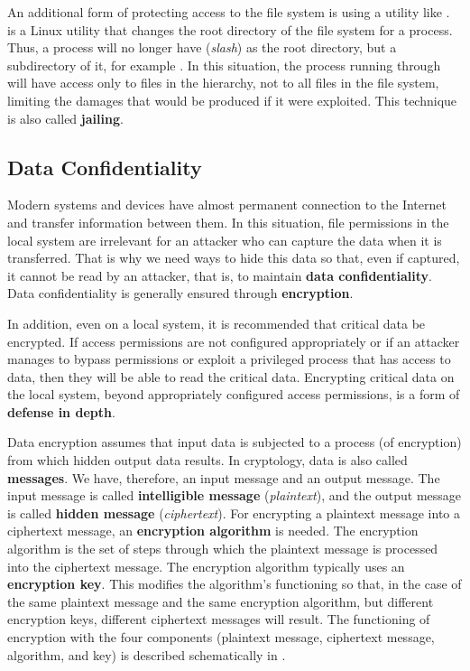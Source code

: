 An additional form of protecting access to the file system is using a utility like .
 is a Linux utility that changes the root directory of the file system for a process.
Thus, a process will no longer have \file{/} (\textit{slash}) as the root directory, but a subdirectory of it, for example .
In this situation, the process running through  will have access only to files in the  hierarchy, not to all files in the file system, limiting the damages that would be produced if it were exploited.
This technique is also called \textbf{jailing}.

\subsection{Data Confidentiality}
\label{sec:sec:data:confidentiality}

Modern systems and devices have almost permanent connection to the Internet and transfer information between them.
In this situation, file permissions in the local system are irrelevant for an attacker who can capture the data when it is transferred.
That is why we need ways to hide this data so that, even if captured, it cannot be read by an attacker, that is, to maintain \textbf{data confidentiality}.
Data confidentiality is generally ensured through \textbf{encryption}.

In addition, even on a local system, it is recommended that critical data be encrypted.
If access permissions are not configured appropriately or if an attacker manages to bypass permissions or exploit a privileged process that has access to data, then they will be able to read the critical data.
Encrypting critical data on the local system, beyond appropriately configured access permissions, is a form of \textbf{defense in depth}.

Data encryption assumes that input data is subjected to a process (of encryption) from which hidden output data results.
In cryptology, data is also called \textbf{messages}.
We have, therefore, an input message and an output message.
The input message is called \textbf{intelligible message} (\textit{plaintext}), and the output message is called \textbf{hidden message} (\textit{ciphertext}).
For encrypting a plaintext message into a ciphertext message, an \textbf{encryption algorithm} is needed.
The encryption algorithm is the set of steps through which the plaintext message is processed into the ciphertext message.
The encryption algorithm typically uses an \textbf{encryption key}.
This modifies the algorithm's functioning so that, in the case of the same plaintext message and the same encryption algorithm, but different encryption keys, different ciphertext messages will result.
The functioning of encryption with the four components (plaintext message, ciphertext message, algorithm, and key) is described schematically in .

